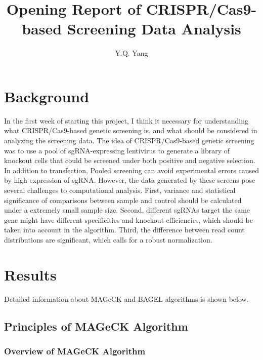 \documentclass[fleqn,10pt]{wlscirep}
\title{Opening Report of CRISPR/Cas9-based Screening Data Analysis}
\author[1]{Y.Q. Yang}
\begin{document}
\flushbottom
\maketitle
%
%
\thispagestyle{empty}


\section*{Background}

In the first week of starting this project, I think it necessary for understanding what CRISPR/Cas9-based genetic screening is, and what should be considered in analyzing the screening data.  The idea of CRISPR/Cas9-based genetic screening was to use a pool of sgRNA-expressing lentivirus to generate a library of knockout cells that could be screened under both positive and negative selection. \cite{wang2014genetic} In addition to transfection, Pooled screening can avoid experimental errors caused by high expression of sgRNA.
However, the data generated by these screens pose several challenges to computational analysis. First, variance and statistical significance of comparisons between sample and control should be calculated under a extremely small sample size.  Second, different sgRNAs target the same gene might have different specificities and knockout efficiencies, which should be taken into account in the algorithm.  Third, the difference between read count distributions are significant, which calls for a robust normalization. \cite{li2014mageck}

\section*{Results}

Detailed information about MAGeCK and BAGEL algorithms is shown below.

\subsection*{Principles of MAGeCK Algorithm}

\subsubsection*{Overview of MAGeCK Algorithm}
\end{document}
